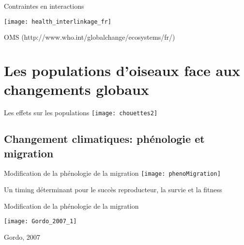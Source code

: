 \documentclass[10pt]{beamer}
\begin{document}
\begin{frame}{Contraintes en interactions}
  \begin{center}
    \texttt{[image: health\_interlinkage\_fr]} 
  \end{center}
  \begin{tiny}
  OMS (http://www.who.int/globalchange/ecosystems/fr/)
  \end{tiny}
\end{frame}


 \section[Les effets sur les populations]{Les populations d'oiseaux face aux changements globaux}

\begin{frame} {Les effets sur les populations}
 \texttt{[image: chouettes2]}
\end{frame}

\subsection{Changement climatiques: phénologie et migration} 




\begin{frame}{Modification de la phénologie de la migration}
  \texttt{[image: phenoMigration]}
  \\
  \vspace{20pt}
  \begin{center}
    Un timing déterminant pour le succès reproducteur, la survie et la fitness
  \end{center}
\end{frame}

\begin{frame}{Modification de la phénologie de la migration}
 
 \begin{center}
   \texttt{[image: Gordo\_2007\_1]}

  \end{center}
  \begin{tiny}
    Gordo, 2007

  \end{tiny}
\end{frame}
\end{document}

